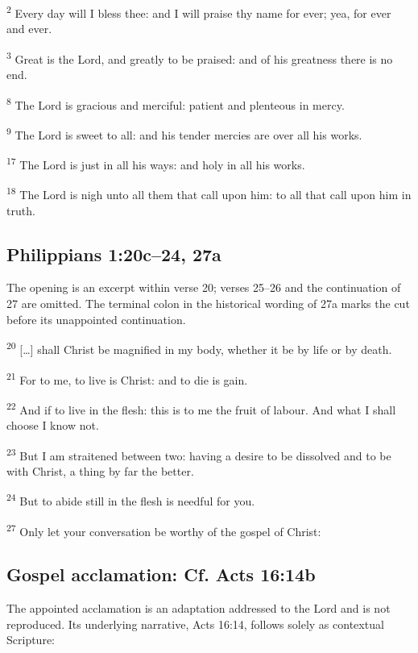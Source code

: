 \textsuperscript{2} Every day will I bless thee: and I will praise thy name for ever; yea, for ever and ever.

\textsuperscript{3} Great is the Lord, and greatly to be praised: and of his greatness there is no end.

\medskip

\textsuperscript{8} The Lord is gracious and merciful: patient and plenteous in mercy.

\textsuperscript{9} The Lord is sweet to all: and his tender mercies are over all his works.

\medskip

\textsuperscript{17} The Lord is just in all his ways: and holy in all his works.

\textsuperscript{18} The Lord is nigh unto all them that call upon him: to all that call upon him in truth.

\subsection{Philippians 1:20c--24, 27a}
\label{proper-second-reading}
The opening is an excerpt within verse 20; verses 25--26 and the continuation of 27 are omitted. The terminal colon in the historical wording of 27a marks the cut before its unappointed continuation.

\textsuperscript{20} [\ldots] shall Christ be magnified in my body, whether it be by life or by death.

\textsuperscript{21} For to me, to live is Christ: and to die is gain.

\textsuperscript{22} And if to live in the flesh: this is to me the fruit of labour. And what I shall choose I know not.

\textsuperscript{23} But I am straitened between two: having a desire to be dissolved and to be with Christ, a thing by far the better.

\textsuperscript{24} But to abide still in the flesh is needful for you.

\textsuperscript{27} Only let your conversation be worthy of the gospel of Christ:

\subsection{Gospel acclamation: Cf. Acts 16:14b}
\label{proper-acclamation}
The appointed acclamation is an adaptation addressed to the Lord and is not reproduced. Its underlying narrative, Acts 16:14, follows solely as contextual Scripture:

